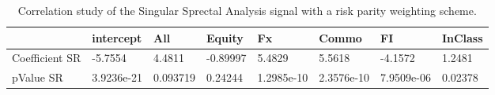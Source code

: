 \begin{table}[H]
\centering
\begin{tabular}{llllllll}
& intercept & All & Equity & Fx & Commo & FI & InClass \\ 
\hline 
Coefficient SR & -5.7554 & 4.4811 & -0.89997 & 5.4829 & 5.5618 & -4.1572 & 1.2481 \\ 
pValue SR & 3.9236e-21 & 0.093719 & 0.24244 & 1.2985e-10 & 2.3576e-10 & 7.9509e-06 & 0.02378 \\ 
\hline
\end{tabular}
\caption{Correlation study of the Singular Sprectal Analysis signal with a risk parity weighting scheme.}
\label{SSA_RP_CORR}
\end{table}